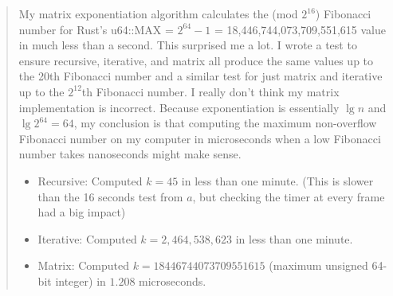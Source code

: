 \documentclass[11pt]{article}
\begin{document}
\begin{enumerate}[leftmargin=*]
\begin{enumerate}
\begin{quote}
  \medskip
  My matrix exponentiation algorithm calculates the (mod $2^{16}$) Fibonacci number for Rust's u64::MAX = $2^{64} - 1$ = 18,446,744,073,709,551,615 value in much less than a second. This surprised me a lot. I wrote a test to ensure recursive, iterative, and matrix all produce the same values up to the 20th Fibonacci number and a similar test for just matrix and iterative up to the $2^{12}$th Fibonacci number. I really don't think my matrix implementation is incorrect. Because exponentiation is essentially $\lg n$ and $\lg 2^{64} = 64$, my conclusion is that computing the maximum non-overflow Fibonacci number on my computer in microseconds when a low Fibonacci number takes nanoseconds might make sense.

  \begin{itemize}
    \item Recursive: Computed $k = 45$ in less than one minute. (This is slower than the 16 seconds test from $a$, but checking the timer at every frame had a big impact)
    \item Iterative: Computed $k = 2,464,538,623$ in less than one minute.
    \item Matrix: Computed $k = 18446744073709551615$ (maximum unsigned 64-bit integer) in $1.208$ microseconds.
  \end{itemize}

\end{quote}
\end{enumerate}



\end{enumerate}
\end{document}
